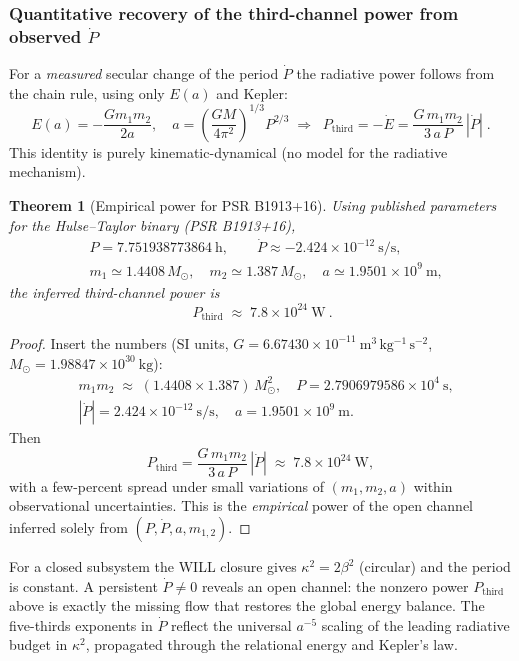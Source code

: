 \documentclass[12pt, a4paper]{article}
\newtheorem{theorem}{Theorem}[section]
\begin{document}
\subsubsection*{Quantitative recovery of the third-channel power from observed \texorpdfstring{$\dot P$}{Pdot}}
For a \emph{measured} secular change of the period $\dot P$ the radiative power follows from the chain rule, using only $E(a)$ and Kepler:
\[
E(a)=-\frac{Gm_{1}m_{2}}{2a},\quad 
a=\left(\frac{GM}{4\pi^{2}}\right)^{\!1/3} P^{2/3}
\;\Rightarrow\;
\boxed{\;
P_{\text{third}}
=-\dot E
=\frac{G\,m_{1}m_{2}}{3\,a\,P}\,|\dot P|\; }.
\]
This identity is purely kinematic-dynamical (no model for the radiative mechanism).

\begin{theorem}[Empirical power for PSR B1913+16]
Using published parameters for the Hulse–Taylor binary (PSR B1913+16),
\[
\begin{aligned}
&P=7.751938773864\ \text{h},\qquad \dot P \approx -2.424\times 10^{-12}\ \text{s/s},\\
&m_{1}\simeq 1.4408\,M_{\odot},\quad m_{2}\simeq 1.387\,M_{\odot},\quad
a\simeq 1.9501\times 10^{9}\ \text{m},
\end{aligned}
\]
the inferred third-channel power is
\[
\boxed{\ P_{\text{third}}\;\approx\;7.8\times 10^{24}\ \text{W}\ }.
\]
\end{theorem}

\begin{proof}
Insert the numbers (SI units, $G=6.67430\times10^{-11}\ \mathrm{m^{3}\,kg^{-1}\,s^{-2}}$, $M_{\odot}=1.98847\times10^{30}\ \mathrm{kg}$):
\[
\begin{aligned}
&m_{1}m_{2}\;\approx\;(1.4408\times1.387)\,M_{\odot}^{2},\quad
P=2.7906979586\times10^{4}\ \mathrm{s},\\
&|\dot P|=2.424\times10^{-12}\ \mathrm{s/s},\quad
a=1.9501\times10^{9}\ \mathrm{m}.
\end{aligned}
\]
Then
\[
P_{\text{third}}
=\frac{G\,m_{1}m_{2}}{3\,a\,P}\,|\dot P|
\;\approx\;
7.8\times 10^{24}\ \mathrm{W},
\]
with a few-percent spread under small variations of $(m_{1},m_{2},a)$ within observational uncertainties. This is the \emph{empirical} power of the open channel inferred solely from $(P,\dot P,a,m_{1,2})$.
\end{proof}

\begin{tcolorbox}[colback=gray!4, colframe=black!60, title=Interpretation in WILL]
For a closed subsystem the WILL closure gives $\kappa^{2}=2\beta^{2}$ (circular) and the period is constant. A persistent $\dot P\neq0$ reveals an open channel: the nonzero power $P_{\text{third}}$ above is exactly the missing flow that restores the global energy balance. The five-thirds exponents in $\dot P$ reflect the universal $a^{-5}$ scaling of the leading radiative budget in $\kappa^{2}$, propagated through the relational energy and Kepler’s law.
\end{tcolorbox}
\end{document}
